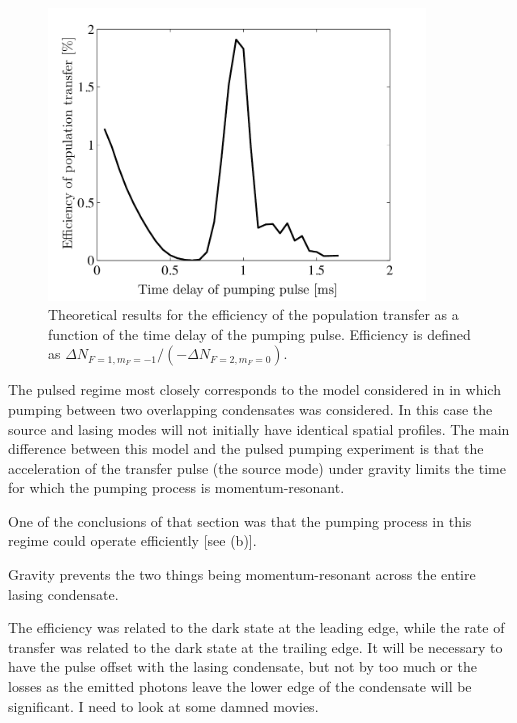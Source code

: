 \begin{figure}
    \centering
    \includegraphics[width=10cm]{PulsedPumpingTheoryTransferEfficiency}
    \caption{Theoretical results for the efficiency of the population transfer as a function of the time delay of the pumping pulse.  Efficiency is defined as $\Delta N_{F=1, m_F=-1} / (-\Delta N_{F=2, m_F=0})$.}
    \label{OpticalPumping:PulsedPumpingTheoryTransferEfficiency}
\end{figure}


The pulsed regime most closely corresponds to the model considered in  in which pumping between two overlapping condensates was considered.  In this case the source and lasing modes will not initially have identical spatial profiles.  The main difference between this model and the pulsed pumping experiment is that the acceleration of the transfer pulse (the source mode) under gravity limits the time for which the pumping process is momentum-resonant.





One of the conclusions of that section was that the pumping process in this regime could operate efficiently [see (b)].

Gravity prevents the two things being momentum-resonant across the entire lasing condensate.


The efficiency was related to the dark state at the leading edge, while the rate of transfer was related to the dark state at the trailing edge.  It will be necessary to have the pulse offset with the lasing condensate, but not by too much or the losses as the emitted photons leave the lower edge of the condensate will be significant.  I need to look at some damned movies.

